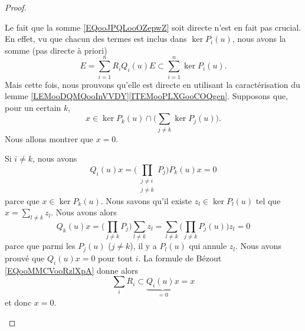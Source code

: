 \begin{proof}
\begin{subproof}
		Le fait que la somme \eqref{EQooJPQLooOZepwZ} soit directe n'est en fait pas crucial. En effet, vu que chacun des termes est inclus dans \( \ker P_i(u)\), nous avons la somme (pas directe à priori)
		\begin{equation}		\label{EQooOEJHooPzmWbu}
			E=\sum_{i=1}^nR_iQ_i(u)E\subset\sum_{i=1}^n\ker P_i(u).
		\end{equation}
		Mais cette fois, nous prouvons qu'elle est directe en utilisant la caractérisation du lemme \ref{LEMooDQMQooInVVDY}\ref{ITEMooPLXGooCOQgen}. Supposons que, pour un certain \( k\),
		\begin{equation}
			x\in\ker P_k(u)\cap\big( \sum_{j\neq k}\ker P_j(u) \big).
		\end{equation}
		Nous allons montrer que \( x=0\).
		\begin{subproof}
			\spitem[\( Q_i(u)x=0\) si \( i\neq k\)]
			Si \( i\neq k\), nous avons
			\begin{equation}
				Q_i(u)x=\Big( \prod_{\substack{j\neq i\\j\neq k}}P_j \Big)P_k(u)x=0
			\end{equation}
			parce que \( x\in\ker P_k(u)\).
			\spitem[\( Q_k(u)x=0\)]
			Nous savons qu'il existe \( z_l\in\ker P_l(u)\) tel que \( x=\sum_{l\neq k}z_l\). Nous avons alors
			\begin{equation}
				Q_k(u)x=\Big( \prod_{j\neq k}P_j \Big)\sum_{l\neq k}z_l=\sum_{l\neq k}\Big( \prod_{j\neq k}P_j(u) \Big)z_l=0
			\end{equation}
			parce que parmi les \( P_j(u)\) (\( j\neq k\)), il y a \( P_l(u)\) qui annule \( z_l\).
			\spitem[Et finalement]
			Nous avons prouvé que \( Q_i(u)x=0\) pour tout \( i\). La formule de Bézout \eqref{EQooMMCVooRzlXpA} donne alors
			\begin{equation}
				\sum_iR_i\subset\underbrace{Q_i(u)x}_{=0}=x
			\end{equation}
			et donc \( x=0\).


\end{subproof}
\end{subproof}
\end{proof}
